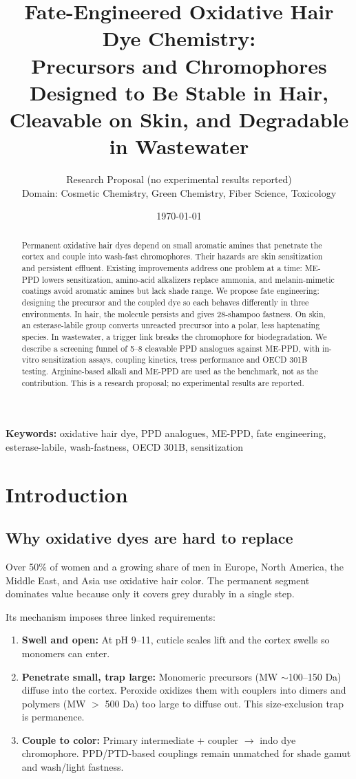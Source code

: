\documentclass[11pt,a4paper]{article}
\title{\Large\bfseries Fate-Engineered Oxidative Hair Dye Chemistry:\\
Precursors and Chromophores Designed to Be Stable in Hair,\\
Cleavable on Skin, and Degradable in Wastewater}
\author{Research Proposal (no experimental results reported) \\ Domain: Cosmetic Chemistry, Green Chemistry, Fiber Science, Toxicology}
\date{\today}
\begin{document}
\maketitle

\begin{abstract}
Permanent oxidative hair dyes depend on small aromatic amines that penetrate the cortex and couple into wash-fast chromophores. Their hazards are skin sensitization and persistent effluent. Existing improvements address one problem at a time: ME-PPD lowers sensitization, amino-acid alkalizers replace ammonia, and melanin-mimetic coatings avoid aromatic amines but lack shade range. We propose fate engineering: designing the precursor and the coupled dye so each behaves differently in three environments. In hair, the molecule persists and gives 28-shampoo fastness. On skin, an esterase-labile group converts unreacted precursor into a polar, less haptenating species. In wastewater, a trigger link breaks the chromophore for biodegradation. We describe a screening funnel of 5--8 cleavable PPD analogues against ME-PPD, with in-vitro sensitization assays, coupling kinetics, tress performance and OECD 301B testing. Arginine-based alkali and ME-PPD are used as the benchmark, not as the contribution. This is a research proposal; no experimental results are reported.
\end{abstract}

\noindent\textbf{Keywords:} oxidative hair dye, PPD analogues, ME-PPD, fate engineering, esterase-labile, wash-fastness, OECD 301B, sensitization

\tableofcontents
\newpage

\section{Introduction}

\subsection{Why oxidative dyes are hard to replace}
Over 50\% of women and a growing share of men in Europe, North America, the Middle East, and Asia use oxidative hair color. The permanent segment dominates value because only it covers grey durably in a single step.

Its mechanism imposes three linked requirements:
\begin{enumerate}[leftmargin=1.5em]
\item \textbf{Swell and open:} At pH 9--11, cuticle scales lift and the cortex swells so monomers can enter.
\item \textbf{Penetrate small, trap large:} Monomeric precursors (MW $\sim$100--150 Da) diffuse into the cortex. Peroxide oxidizes them with couplers into dimers and polymers (MW $>$ 500 Da) too large to diffuse out. This size-exclusion trap is permanence.
\item \textbf{Couple to color:} Primary intermediate + coupler $\rightarrow$ indo dye chromophore. PPD/PTD-based couplings remain unmatched for shade gamut and wash/light fastness.
\end{enumerate}
\end{document}
